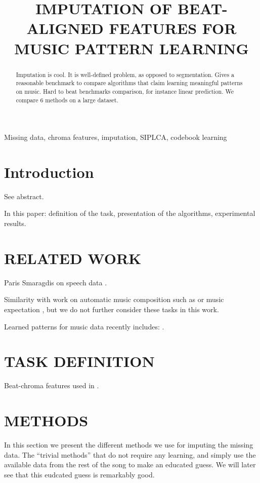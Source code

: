 \documentclass{article}
\title{IMPUTATION OF BEAT-ALIGNED FEATURES FOR MUSIC PATTERN LEARNING}
\begin{document}
%
\maketitle
%
\begin{abstract}
Imputation is cool. It is well-defined problem, as opposed to segmentation.
Gives a reasonable benchmark to compare algorithms that claim learning meaningful
patterns on music. Hard to beat benchmarks comparison, for instance linear
prediction. We compare 6 methods on a large dataset.
\end{abstract}
%
\begin{keywords}
Missing data, chroma features, imputation, SIPLCA, codebook learning
\end{keywords}
%
\section{Introduction}
\label{sec:intro}

See abstract.

In this paper: definition of the task, presentation of the algorithms, experimental
results.

\section{RELATED WORK}
\label{sec:relatedwork}

Paris Smaragdis on speech data \cite{Smaragdis2009}.

Similarity with work on automatic music composition such as \cite{Mozer1994a} or music
expectation \cite{Hazan2010}, but we do not further consider these tasks in this work.

Learned patterns for music data recently includes: \cite{Bertin-Mahieux2010a,Casey2007,Weiss2010}.

\section{TASK DEFINITION}
\label{sec:task}
Beat-chroma features used in \cite{Ellis2007a}.


\section{METHODS}
\label{sec:methods}
In this section we present the different methods we use for imputing the missing data.
The ``trivial methods'' that do not require any learning, and simply use the available
data from the rest of the song to make an educated guess. We will later see that this
eudcated guess is remarkably good.
\end{document}

